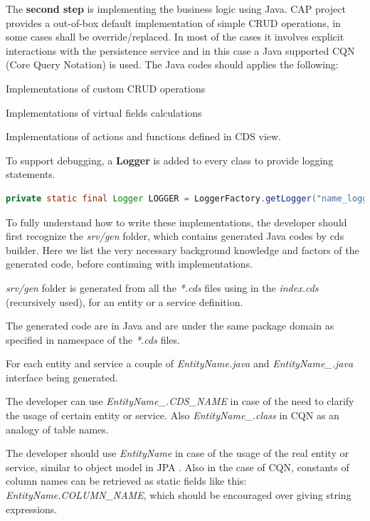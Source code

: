 The \textbf{second step} is implementing the business logic using Java. CAP project provides a out-of-box default implementation of simple CRUD \cite{crud} operations, in some cases shall be override/replaced. In most of the cases it involves explicit interactions with the persistence service and in this case a Java supported CQN (Core Query Notation) \cite{cap-cds-cqn} is used. The Java codes should applies the following:
\begin{compactenum}
	\item Implementations of custom CRUD operations
	\item Implementations of virtual fields calculations
	\item Implementations of actions and functions defined in CDS view.
\end{compactenum}

\bigskip
To support debugging, a \textbf{Logger} is added to every class to provide logging statements.

\begin{lstlisting}[language={java}]
 private static final Logger LOGGER = LoggerFactory.getLogger("name_logger");
\end{lstlisting}

\bigskip
To fully understand how to write these implementations, the developer should first recognize the \textit{srv/gen} folder, which contains generated Java codes by cds builder. Here we list the very necessary background knowledge and factors of the generated code, before continuing with implementations. 
\begin{compactenum}
	\item \textit{srv/gen} folder is generated from all the \textit{*.cds} files using in the \textit{index.cds} (recursively used), for an entity or a service definition.
    \item The generated code are in Java and are under the same package domain as specified in namespace of the \textit{*.cds} files.
    \item For each entity and service a couple of \textit{EntityName.java} and \textit{EntityName\_.java} interface being generated. 
    \item The developer can use \textit{EntityName\_.CDS\_NAME} in case of the need to clarify the usage of certain entity or service. Also \textit{EntityName\_.class} in CQN as an analogy of table names. 
    \item The developer should use \textit{EntityName} in case of the usage of the real entity or service, similar to object model in JPA \cite{jpa}. Also in the case of CQN, constants of column names can be retrieved as static fields like this: \textit{EntityName.COLUMN\_NAME}, which should be encouraged over giving string expressions.
\end{compactenum}

